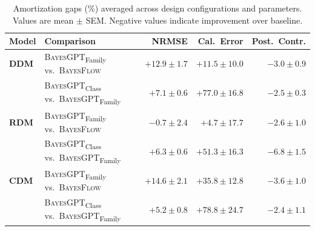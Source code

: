 \begin{table}[ht]
\centering
\small
\caption{Amortization gaps (\%) averaged across design configurations and parameters.
Values are mean $\pm$ SEM. Negative values indicate improvement over baseline.}
\label{tab:amortization-gap}
\begin{tabular}{llrrr}
\toprule
\textbf{Model} & \textbf{Comparison} & NRMSE & Cal.\ Error & Post.\ Contr. \\
\midrule
\textbf{DDM} & \textsc{BayesGPT}\textsubscript{Family} vs.\ \textsc{BayesFlow} & $+12.9 \pm 1.7$ & $+11.5 \pm 10.0$ & $-3.0 \pm 0.9$ \\
 & \textsc{BayesGPT}\textsubscript{Class} vs.\ \textsc{BayesGPT}\textsubscript{Family} & $+7.1 \pm 0.6$ & $+77.0 \pm 16.8$ & $-2.5 \pm 0.3$ \\
\midrule
\textbf{RDM} & \textsc{BayesGPT}\textsubscript{Family} vs.\ \textsc{BayesFlow} & $-0.7 \pm 2.4$ & $+4.7 \pm 17.7$ & $-2.6 \pm 1.0$ \\
 & \textsc{BayesGPT}\textsubscript{Class} vs.\ \textsc{BayesGPT}\textsubscript{Family} & $+6.3 \pm 0.6$ & $+51.3 \pm 16.3$ & $-6.8 \pm 1.5$ \\
\midrule
\textbf{CDM} & \textsc{BayesGPT}\textsubscript{Family} vs.\ \textsc{BayesFlow} & $+14.6 \pm 2.1$ & $+35.8 \pm 12.8$ & $-3.6 \pm 1.0$ \\
 & \textsc{BayesGPT}\textsubscript{Class} vs.\ \textsc{BayesGPT}\textsubscript{Family} & $+5.2 \pm 0.8$ & $+78.8 \pm 24.7$ & $-2.4 \pm 1.1$ \\
\bottomrule
\end{tabular}
\end{table}